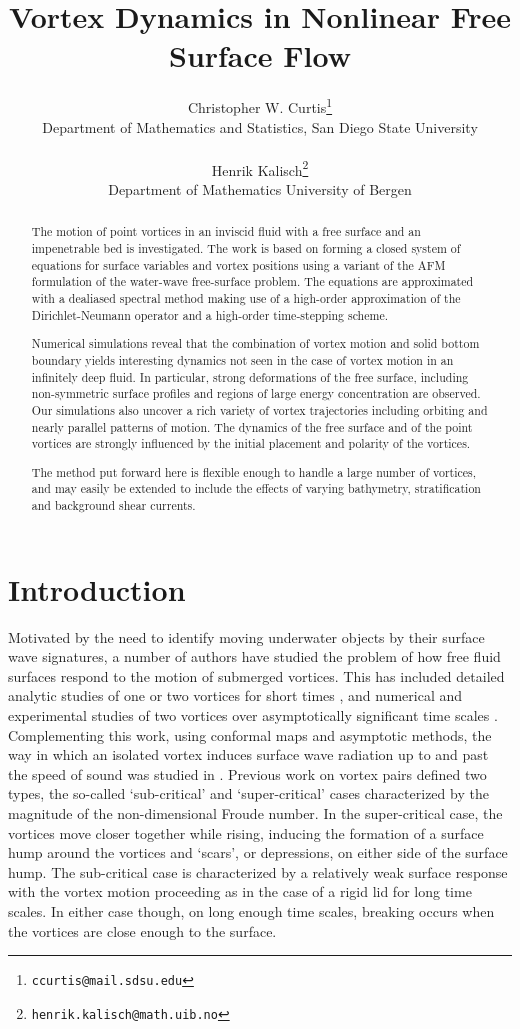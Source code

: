 \documentclass[a4paper,11pt]{article}
\title{Vortex Dynamics in Nonlinear Free Surface Flow}
\author{Christopher W. Curtis\footnote{\texttt{ccurtis@mail.sdsu.edu}} \\
{\small Department of Mathematics and Statistics, San Diego State University} 
\\\\
Henrik Kalisch\footnote{\texttt{henrik.kalisch@math.uib.no}}
\\ {\small Department of Mathematics University of Bergen} 
}
\date{}
\begin{document}
\maketitle

\begin{abstract}
The motion of point vortices in an inviscid fluid with a free surface and an impenetrable bed is investigated.
The work is based on forming a closed system of equations for surface variables and vortex positions 
using a variant of the AFM formulation \cite{afm} of the water-wave free-surface problem. 
The equations are approximated with a dealiased spectral method 
making use of a high-order approximation of the Dirichlet-Neumann operator
and a high-order time-stepping scheme. 

Numerical simulations reveal that the combination of vortex motion and solid bottom boundary
yields interesting dynamics not seen in the case of vortex motion in an infinitely deep fluid.
In particular, strong deformations of the free surface,
including non-symmetric surface profiles and regions of large energy concentration are observed.
Our simulations also uncover a rich variety of vortex trajectories including
orbiting and nearly parallel patterns of motion.
The dynamics of the free surface and of the point vortices
are strongly influenced by the initial placement and polarity of the vortices.

The method put forward here is flexible enough to handle a large number of vortices,
and may easily be extended to include the effects of varying bathymetry, 
stratification and background shear currents.
\end{abstract}


\section{Introduction}
Motivated by the need to identify moving underwater objects by their surface wave signatures, a number of authors have studied the problem of how free fluid surfaces respond to the motion of submerged vortices.  This has included detailed analytic studies of one or two vortices for short times \cite{tyvand1,tyvand2}, and numerical and experimental studies of two vortices over asymptotically significant time scales \cite{fish,marcus,telste,tryggvason}.  Complementing this work, using conformal maps and asymptotic methods, the way in which an isolated vortex induces surface wave radiation up to and past the speed of sound was studied  in \cite{ruban}.  Previous work on vortex pairs defined two types, the so-called `sub-critical' and `super-critical' cases characterized by the magnitude of the non-dimensional Froude number.  In the super-critical case, the vortices move closer together while rising, inducing the formation of a surface hump around the vortices and `scars', or depressions, on either side of the surface hump.  The sub-critical case is characterized by a relatively weak surface response with the vortex motion proceeding as in the case of a rigid lid for long time scales.  In either case though, on long enough time scales, breaking occurs when the vortices are close enough to the surface.  
\end{document}

